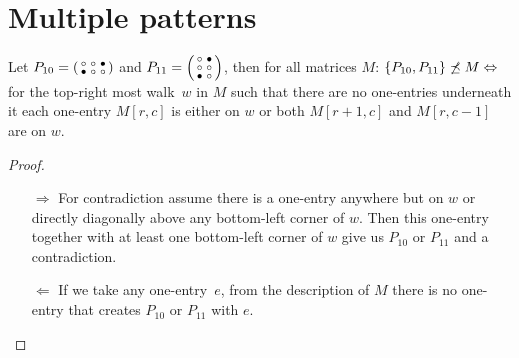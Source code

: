 \section{Multiple patterns}

\begin{thm}
Let $P_{10}=\left(\begin{smallmatrix}\circ&\circ&\bullet\\\bullet&\circ&\circ\end{smallmatrix}\right)$ and $P_{11}=\left(\begin{smallmatrix}\circ&\bullet\\\circ&\circ\\\bullet&\circ\end{smallmatrix}\right)$, then for all matrices $M$: $\{P_{10},P_{11}\}\not\preceq M\Leftrightarrow$ for the top-right most walk~$w$ in $M$ such that there are no one-entries underneath it each one-entry $M[r,c]$ is either on $w$ or both $M[r+1,c]$ and $M[r,c-1]$ are on $w$.
\end{thm}
\begin{proof}
\begin{itemize}
	\item[$\Rightarrow$] For contradiction assume there is a one-entry anywhere but on $w$ or directly diagonally above any bottom-left corner of $w$. Then this one-entry together with at least one bottom-left corner of $w$ give us $P_{10}$ or $P_{11}$ and a contradiction.
	\item[$\Leftarrow$] If we take any one-entry~$e$, from the description of $M$ there is no one-entry that creates $P_{10}$ or $P_{11}$ with $e$.
\end{itemize}
\end{proof}